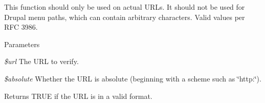 This function should only be used on actual URLs. It should not be used for Drupal menu paths, which can contain arbitrary characters. Valid values per RFC 3986. 
\begin{DoxyParams}{Parameters}
\item[{\em \$url}]The URL to verify. \item[{\em \$absolute}]Whether the URL is absolute (beginning with a scheme such as \char`\"{}http:\char`\"{}).\end{DoxyParams}
\begin{DoxyReturn}{Returns}
TRUE if the URL is in a valid format. 
\end{DoxyReturn}
